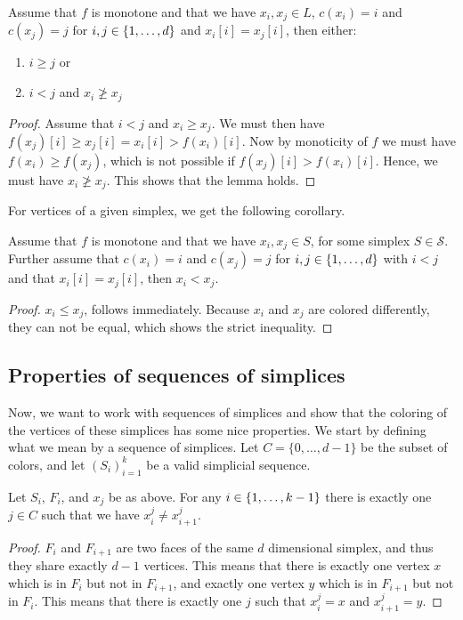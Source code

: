\begin{lemma}
	\label{lem:monotone_coloring}
	Assume that $f$ is monotone and that we have $x_i, x_j \in L$, $c(x_i) = i$ and $c(x_j) = j$ for $i, j \in \left\{1, \dots, d\right\}$ and $x_i[i] = x_j[i]$, then either:
	\begin{enumerate}
		\item $i \geq j$ or
		\item $i < j$ and $x_i \not\geq x_j$
	\end{enumerate}
\end{lemma}
\begin{proof}
	Assume that $i < j$ and $x_i \geq x_j$. We must then have $f(x_j)[i] \geq x_j[i] = x_i[i] > f(x_i)[i]$. Now by monoticity of $f$ we must have $f(x_i) \geq f(x_j)$, which is not possible if $f(x_j)[i] > f(x_i)[i]$. Hence, we must have $x_i \not\geq x_j$. This shows that the lemma holds.
\end{proof}

For vertices of a given simplex, we get the following corollary.
\begin{corollary}
	\label{cor:monotone_coloring}
	Assume that $f$ is monotone and that we have $x_i, x_j \in S$, for some simplex $S\in \mathcal{S}$. Further assume that $c(x_i) = i$ and $c(x_j) = j$ for $i, j \in \left\{1, \dots, d\right\}$ with $i < j$ and that $x_i[i] = x_j[i]$, then $x_i < x_j$.
\end{corollary}
\begin{proof}
	$x_i \leq x_j$, follows immediately. Because $x_i$ and $x_j$ are colored differently, they can not be equal, which shows the strict inequality.
\end{proof}

\subsection{Properties of sequences of simplices}

Now, we want to work with sequences of simplices and show that the coloring of the vertices of these simplices has some nice properties. We start by defining what we mean by a sequence of simplices. Let $C = \{0, \dots, d-1\}$ be the subset of colors, and let $\left(S_i\right)_{i=1}^k$ be a valid simplicial sequence.
\begin{lemma}
	Let $S_i$, $F_i$, and $x_j$ be as above. For any $i \in \left\{1, \dots, k-1\right\}$ there is exactly one $j \in C$ such that we have $x_i^j \neq x_{i+1}^j$.
\end{lemma}
\begin{proof}
	$F_i$ and $F_{i+1}$ are two faces of the same $d$ dimensional simplex, and thus they share exactly $d-1$ vertices. This means that there is exactly one vertex $x$ which is in $F_i$ but not in $F_{i+1}$, and exactly one vertex $y$ which is in $F_{i+1}$ but not in $F_i$. This means that there is exactly one $j$ such that $x_i^j = x$ and $x_{i+1}^j = y$.
\end{proof}

